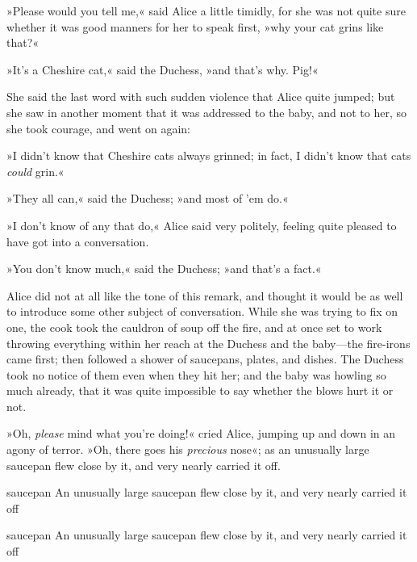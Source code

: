 »Please would you tell me,« said Alice a little timidly, for she was not quite sure whether it was good manners for her to speak first, »why your cat grins like that?«

»It's a Cheshire cat,« said the Duchess, »and that's why. Pig!«

She said the last word with such sudden violence that Alice quite jumped; but she saw in another moment that it was addressed to the baby, and not to her, so she took courage, and went on again:

»I didn't know that Cheshire cats always grinned; in fact, I didn't know that cats \textit{could} grin.«

»They all can,« said the Duchess; »and most of 'em do.«

»I don't know of any that do,« Alice said very politely, feeling quite pleased to have got into a conversation.

»You don't know much,« said the Duchess; »and that's a fact.«

Alice did not at all like the tone of this remark, and thought it would be as well to introduce some other subject of conversation. While she was trying to fix on one, the cook took the cauldron of soup off the fire, and at once set to work throwing everything within her reach at the Duchess and the baby—the fire-irons came first; then followed a shower of saucepans, plates, and dishes. The Duchess took no notice of them even when they hit her; and the baby was howling so much already, that it was quite impossible to say whether the blows hurt it or not.

»Oh, \textit{please} mind what you're doing!« cried Alice, jumping up and down in an agony of terror. »Oh, there goes his \textit{precious} nose«; as an unusually large saucepan flew close by it, and very nearly carried it off.


\begin{pictures}
	\begin{letter}
		\begin{colorbigpic}
			[1.2]
			{saucepan}
			{An unusually large saucepan flew close by it, and very nearly carried it off}
		\end{colorbigpic}
	\end{letter}
	
	\begin{a4}
		\begin{colorbigpic}
			[1.1]
			{saucepan}
			{An unusually large saucepan flew close by it, and very nearly carried it off}
		\end{colorbigpic}
	\end{a4}	
\end{pictures}


